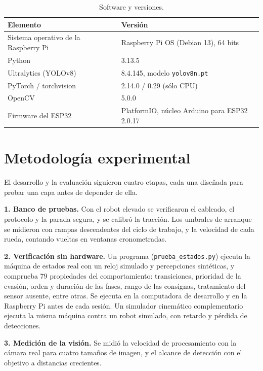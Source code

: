\documentclass[pdflatex,sn-mathphys-num]{sn-jnl}
\newcommand{\cod}[1]{\texttt{#1}}
\begin{document}
\begin{table}[htbp]
  \caption{Software y versiones.}
  \label{tab:versiones}
  \centering
  \begin{tabular}{@{}L{4.2cm}L{8.0cm}@{}}
    \toprule
    \textbf{Elemento} & \textbf{Versi\'on} \\
    \midrule
    Sistema operativo de la Raspberry Pi & Raspberry Pi OS (Debian 13), 64 bits \\
    Python & 3.13.5 \\
    Ultralytics (YOLOv8) & 8.4.145, modelo \cod{yolov8n.pt} \\
    PyTorch / torchvision & 2.14.0 / 0.29 (s\'olo CPU) \\
    OpenCV & 5.0.0 \\
    Firmware del ESP32 & PlatformIO, n\'ucleo Arduino para ESP32 2.0.17 \\
    \bottomrule
  \end{tabular}
\end{table}

\section{Metodolog\'ia experimental}\label{sec:metodologia}

El desarrollo y la evaluaci\'on siguieron cuatro etapas, cada una dise\~nada
para probar una capa antes de depender de ella.

\textbf{1. Banco de pruebas.} Con el robot elevado se verificaron el
cableado, el protocolo y la parada segura, y se calibr\'o la tracci\'on. Los
umbrales de arranque se midieron con rampas descendentes del ciclo de
trabajo, y la velocidad de cada rueda, contando vueltas en ventanas
cronometradas.

\textbf{2. Verificaci\'on sin hardware.} Un programa
(\cod{prueba\_estados.py}) ejecuta la m\'aquina de estados real con un reloj
simulado y percepciones sint\'eticas, y comprueba 79 propiedades del
comportamiento: transiciones, prioridad de la evasi\'on, orden y duraci\'on
de las fases, rango de las consignas, tratamiento del sensor ausente, entre
otras. Se ejecuta en la computadora de desarrollo y en la Raspberry Pi antes
de cada sesi\'on. Un simulador cinem\'atico complementario ejecuta la misma
m\'aquina contra un robot simulado, con retardo y p\'erdida de detecciones.

\textbf{3. Medici\'on de la visi\'on.} Se midi\'o la velocidad de
procesamiento con la c\'amara real para cuatro tama\~nos de imagen, y el
alcance de detecci\'on con el objetivo a distancias crecientes.
\end{document}
